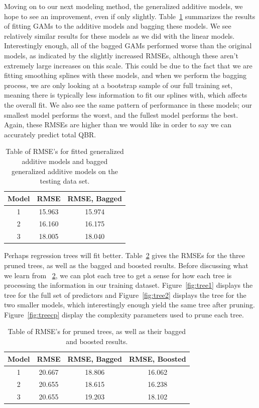 \documentclass[12pt]{article}\usepackage[]{graphicx}\usepackage[]{color}
\begin{document}
Moving on to our next modeling method, the generalized additive models, we hope to see an improvement, even if only slightly. Table~\ref{tab:gamres} summarizes the results of fitting GAMs to the additive models and bagging these models. We see relatively similar results for these models as we did with the linear models. Interestingly enough, all of the bagged GAMs performed worse than the original models, as indicated by the slightly increased RMSEs, although these aren't extremely large increases on this scale. This could be due to the fact that we are fitting smoothing splines with these models, and when we perform the bagging process, we are only looking at a bootstrap sample of our full training set, meaning there is typically less information to fit our splines with, which affects the overall fit. We also see the same pattern of performance in these models; our smallest model performs the worst, and the fullest model performs the best. Again, these RMSEs are higher than we would like in order to say we can accurately predict total QBR.

\begin{table}[h]
\centering
\begin{tabular}{|c|c|c|}
\hline
Model & RMSE & RMSE, Bagged \\
\hline
1 & 15.963 & 15.974 \\
\hline
2 & 16.160 & 16.175 \\
\hline
3 & 18.005 & 18.040 \\
\hline
\end{tabular}
\captionsetup{font=footnotesize,labelfont=footnotesize}
\caption{\label{tab:gamres} Table of RMSE's for fitted generalized additive models and bagged generalized additive models on the testing data set.}
\end{table} 

Perhaps regression trees will fit better. Table~\ref{tab:treeres} gives the RMSEs for the three pruned trees, as well as the bagged and boosted results. Before discussing what we learn from ~\ref{tab:treeres}, we can plot each tree to get a sense for how each tree is processing the information in our training dataset. Figure~\ref{fig:tree1} displays the tree for the full set of predictors and Figure~\ref{fig:tree2} displays the tree for the two smaller models, which interestingly enough yield the same tree after pruning. Figure~\ref{fig:treecp} display the complexity parameters used to prune each tree.

\begin{table}[h]
\centering
\begin{tabular}{|c|c|c|c|}
\hline
Model & RMSE & RMSE, Bagged & RMSE, Boosted \\
\hline
1 & 20.667 & 18.806 & 16.062\\
\hline
2 & 20.655 & 18.615 & 16.238\\
\hline
3 & 20.655 & 19.203 & 18.102\\
\hline
\end{tabular}
\captionsetup{font=footnotesize,labelfont=footnotesize}
\caption{\label{tab:treeres} Table of RMSE's for pruned trees, as well as their bagged and boosted results.}
\end{table}
\end{document}
